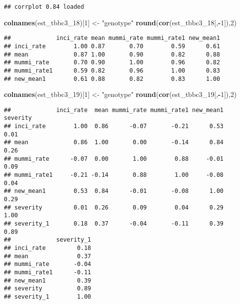 \documentclass[]{article}
\newenvironment{Shaded}{\begin{snugshade}}{\end{snugshade}}
\newcommand{\DecValTok}[1]{\textcolor[rgb]{0.00,0.00,0.81}{#1}}
\newcommand{\KeywordTok}[1]{\textcolor[rgb]{0.13,0.29,0.53}{\textbf{#1}}}
\newcommand{\NormalTok}[1]{#1}
\newcommand{\OperatorTok}[1]{\textcolor[rgb]{0.81,0.36,0.00}{\textbf{#1}}}
\newcommand{\StringTok}[1]{\textcolor[rgb]{0.31,0.60,0.02}{#1}}
\begin{document}
\begin{verbatim}
## corrplot 0.84 loaded
\end{verbatim}

\begin{Shaded}
\begin{Highlighting}[]
\KeywordTok{colnames}\NormalTok{(est_tbbc3_}\DecValTok{18}\NormalTok{)[}\DecValTok{1}\NormalTok{] <-}\StringTok{ "genotype"}
\KeywordTok{round}\NormalTok{(}\KeywordTok{cor}\NormalTok{(est_tbbc3_}\DecValTok{18}\NormalTok{[,}\OperatorTok{-}\DecValTok{1}\NormalTok{]),}\DecValTok{2}\NormalTok{)}
\end{Highlighting}
\end{Shaded}

\begin{verbatim}
##             inci_rate mean mummi_rate mummi_rate1 new_mean1
## inci_rate        1.00 0.87       0.70        0.59      0.61
## mean             0.87 1.00       0.90        0.82      0.88
## mummi_rate       0.70 0.90       1.00        0.96      0.82
## mummi_rate1      0.59 0.82       0.96        1.00      0.83
## new_mean1        0.61 0.88       0.82        0.83      1.00
\end{verbatim}

\begin{Shaded}
\begin{Highlighting}[]
\KeywordTok{colnames}\NormalTok{(est_tbbc3_}\DecValTok{19}\NormalTok{)[}\DecValTok{1}\NormalTok{] <-}\StringTok{ "genotype"}
\KeywordTok{round}\NormalTok{(}\KeywordTok{cor}\NormalTok{(est_tbbc3_}\DecValTok{19}\NormalTok{[,}\OperatorTok{-}\DecValTok{1}\NormalTok{]),}\DecValTok{2}\NormalTok{)}
\end{Highlighting}
\end{Shaded}

\begin{verbatim}
##             inci_rate  mean mummi_rate mummi_rate1 new_mean1 severity
## inci_rate        1.00  0.86      -0.07       -0.21      0.53     0.01
## mean             0.86  1.00       0.00       -0.14      0.84     0.26
## mummi_rate      -0.07  0.00       1.00        0.88     -0.01     0.09
## mummi_rate1     -0.21 -0.14       0.88        1.00     -0.08     0.04
## new_mean1        0.53  0.84      -0.01       -0.08      1.00     0.29
## severity         0.01  0.26       0.09        0.04      0.29     1.00
## severity_1       0.18  0.37      -0.04       -0.11      0.39     0.89
##             severity_1
## inci_rate         0.18
## mean              0.37
## mummi_rate       -0.04
## mummi_rate1      -0.11
## new_mean1         0.39
## severity          0.89
## severity_1        1.00
\end{verbatim}
\end{document}
